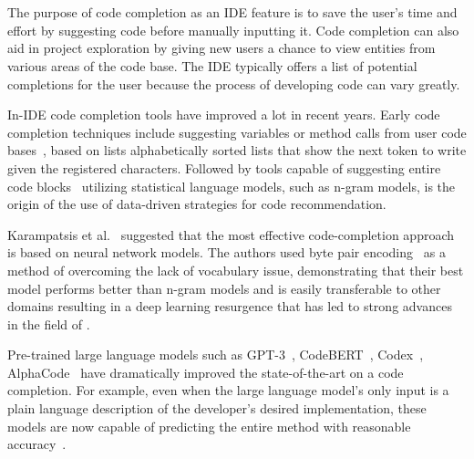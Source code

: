 \section{\cct{}}
The purpose of code completion as an IDE feature is to save the user's time and effort by suggesting code before manually inputting it. Code completion can also aid in project exploration by giving new users a chance to view entities from various areas of the code base. The IDE typically offers a list of potential completions for the user because the process of developing code can vary greatly.

In-IDE code completion tools have improved a lot in recent years. Early code completion techniques include suggesting variables or method calls from user code bases~\cite{mandelin2005}, based on lists alphabetically sorted lists that show the next token to write given the registered characters.
Followed by tools capable of suggesting entire code blocks~\cite{Ciniselli2021} utilizing statistical language models, such as n-gram models, is the origin of the use of data-driven strategies for code recommendation. 

Karampatsis et al.~\cite{karampatsis} suggested that the most effective code-completion approach is based on neural network models. 
The authors used byte pair encoding~\cite{BPE} as a method of overcoming the lack of vocabulary issue, demonstrating that their best model performs better than n-gram models and is easily transferable to other domains resulting in a deep learning resurgence that has led to strong advances in the field of \cct{}. 

Pre-trained large language models such as GPT-3~\cite{Gpt3}, CodeBERT~\cite{codebert}, Codex~\cite{copilot}, AlphaCode~\cite{alphacode} have dramatically improved the state-of-the-art on a code completion. 
For example, even when the large language model's only input is a plain language description of the developer's desired implementation, these models are now capable of predicting the entire method with reasonable accuracy~\cite{copilot}.